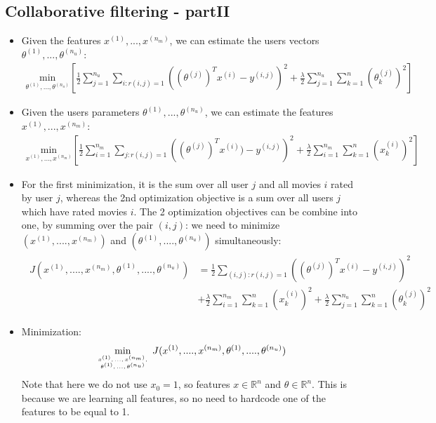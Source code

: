 \documentclass[a4paper,12pt]{report}
\begin{document}
\subsection{Collaborative filtering - partII}
\begin{itemize}
\item Given the features $x^{(1)}, ..., x^{(n_m)}$, we can estimate the users vectors $\theta^{(1)}, ... ,\theta^{(n_u)} $:
	\begin{align}
	\underset{\theta^{(1)},...,\theta^{(n_u)}}{\text{min}} \left[ \frac{1}{2} \sum_{j=1} ^{n_u} \sum _{i:r(i,j)=1} \left( (\theta^{(j)})^T x^{(i)}- y^{(i,j)}\right)^2 + \frac{\lambda}{2} \sum _{j=1} ^{n_u} \sum_{k=1} ^{n}  (\theta_k ^{(j)})^2 \right]
	\end{align}

\item Given the users parameters $\theta^{(1)}, ..., \theta^{(n_u)}$, we can estimate the features $x^{(1)}, ... ,x^{(n_m)} $:
	\begin{align}
	\underset{ x^{(1)},...,x^{(n_m)}}{\text{min}} \left[\frac{1}{2} \sum_{i=1} ^{n_m} \sum _{j:r(i,j)=1} \left( (\theta^{(j)})^T x^{(i)} )- y^{(i,j)}\right)^2 + \frac{\lambda}{2} \sum _{i=1} ^{n_m } \sum_{k=1} ^{n} (x_k ^{(i)})^2 \right]
	\end{align}
\item For the first minimization, it is the sum over all user $j$ and all movies $i$ rated by user $j$, whereas the 2nd optimization objective is a sum over all users $j$ which have rated movies $i$. The 2 optimization objectives can be combine into one, by summing over the pair $(i,j)$:	
we need to minimize $(x^{(1)}, ...., x^{(n_m)})$ and  $(\theta^{(1)}, ...., \theta^{(n_u)})$ simultaneously:
	\begin{align}
	\begin{split}
	J(x^{(1)}, ...., x^{(n_m)}, \theta^{(1)}, ...., \theta^{(n_u)}) &= \frac{1}{2} \sum_{(i,j):r(i,j)=1} \left( (\theta^{(j)})^T x^{(i)} - y^{(i,j)}\right)^2 \\
	& + \frac{\lambda}{2} \sum _{i=1} ^{n_m } \sum_{k=1} ^{n} (x_k ^{(i)})^2 +  \frac{\lambda}{2} \sum_{j=1} ^{n_u} \sum_{k=1} ^{n} (\theta_k ^{(j)})^2
	\end{split}
	\end{align}
\item Minimization:
 	\begin{align}
	\underset{ \tiny{\begin{array}{c}  x^{(1)},...,x^{(n_m)}, \\ \theta^{(1)},...,\theta^{(n_u)}\end{array}}}{\text{min}} J(x^{(1)}, ...., x^{(n_m)}, \theta^{(1)}, ...., \theta^{(n_u)})
	\end{align}
Note that here we do not use $x_0=1$, so features $x \in \mathbb{R}^n$ and $\theta \in \mathbb{R}^n$. This is because we are learning all features, so no need to hardcode one of the features to be equal to 1.
\end{itemize}
\end{document}
